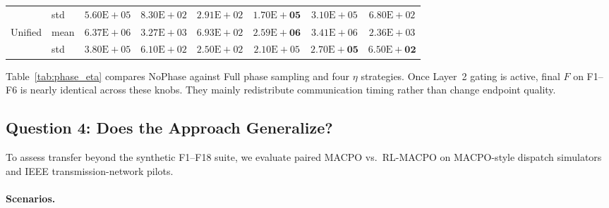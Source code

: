\documentclass[conference]{IEEEtran}
\begin{document}
\begin{table}[!t]
\begin{tabular}{llcccccc}
 & std & $5.60\mathrm{E}\!+\!05$ & $8.30\mathrm{E}\!+\!02$ & $2.91\mathrm{E}\!+\!02$ & $\mathbf{1.70\mathrm{E}\!+\!05}$ & $3.10\mathrm{E}\!+\!05$ & $6.80\mathrm{E}\!+\!02$ \\
Unified & mean & $6.37\mathrm{E}\!+\!06$ & $3.27\mathrm{E}\!+\!03$ & $6.93\mathrm{E}\!+\!02$ & $\mathbf{2.59\mathrm{E}\!+\!06}$ & $3.41\mathrm{E}\!+\!06$ & $2.36\mathrm{E}\!+\!03$ \\
 & std & $3.80\mathrm{E}\!+\!05$ & $6.10\mathrm{E}\!+\!02$ & $2.50\mathrm{E}\!+\!02$ & $2.10\mathrm{E}\!+\!05$ & $\mathbf{2.70\mathrm{E}\!+\!05}$ & $\mathbf{6.50\mathrm{E}\!+\!02}$ \\
\bottomrule
\end{tabular}
\end{table}

Table~\ref{tab:phase_eta} compares NoPhase against Full phase sampling and four $\eta$ strategies. Once Layer~2 gating is active, final $F$ on F1--F6 is nearly identical across these knobs. They mainly redistribute communication timing rather than change endpoint quality.

\subsection{Question 4: Does the Approach Generalize?}\label{sec:exp_q4}\label{sec:applications}
To assess transfer beyond the synthetic F1--F18 suite, we evaluate paired MACPO vs.\ RL-MACPO on MACPO-style dispatch simulators and IEEE transmission-network pilots.

\paragraph{Scenarios.}
\end{document}
